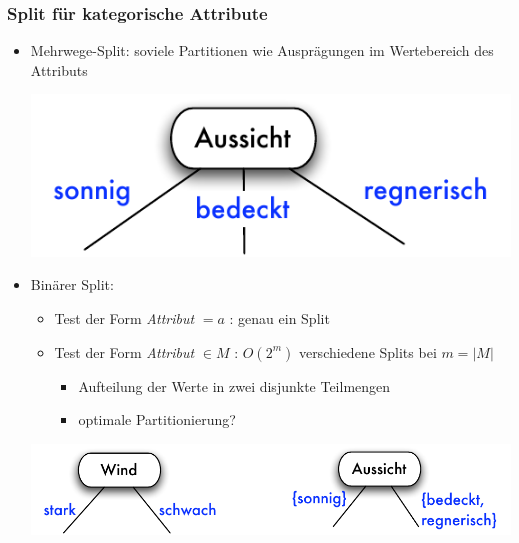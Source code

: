 \begin{frame}
\frametitle{Split für kategorische Attribute}

\begin{itemize}
\item Mehrwege-Split: soviele Partitionen wie Ausprägungen im
  Wertebereich des Attributs 
\begin{center}
\includegraphics[scale=.5]{fig7/split-kat1.pdf}
\end{center}
\item Binärer Split:
\begin{itemize}
\item Test der Form \emph{Attribut} $= a$ : genau ein Split
\item Test der Form \emph{Attribut} $\in M$ : $O(2^m)$ verschiedene
  Splits bei $m=|M|$  
\begin{itemize}
\item Aufteilung der Werte in zwei disjunkte Teilmengen
\item optimale Partitionierung?
\end{itemize}
\end{itemize}
\begin{center}
\includegraphics[scale=.5]{fig7/split-kat2.pdf}
\end{center}
\end{itemize}

\end{frame}



